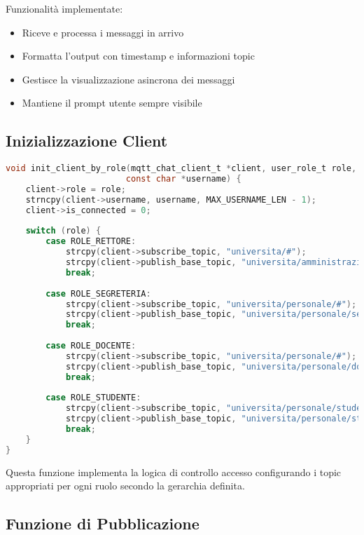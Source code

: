 \documentclass[12pt,a4paper]{article}
\begin{document}
Funzionalità implementate:
\begin{itemize}
    \item Riceve e processa i messaggi in arrivo
    \item Formatta l'output con timestamp e informazioni topic
    \item Gestisce la visualizzazione asincrona dei messaggi
    \item Mantiene il prompt utente sempre visibile
\end{itemize}

\subsection{Inizializzazione Client}

\begin{lstlisting}[language=c, caption=Configurazione Ruolo]
void init_client_by_role(mqtt_chat_client_t *client, user_role_t role, 
                        const char *username) {
    client->role = role;
    strncpy(client->username, username, MAX_USERNAME_LEN - 1);
    client->is_connected = 0;
    
    switch (role) {
        case ROLE_RETTORE:
            strcpy(client->subscribe_topic, "universita/#");
            strcpy(client->publish_base_topic, "universita/amministrazione/rettore");
            break;
            
        case ROLE_SEGRETERIA:
            strcpy(client->subscribe_topic, "universita/personale/#");
            strcpy(client->publish_base_topic, "universita/personale/segreteria");
            break;
            
        case ROLE_DOCENTE:
            strcpy(client->subscribe_topic, "universita/personale/#");
            strcpy(client->publish_base_topic, "universita/personale/docenti");
            break;
            
        case ROLE_STUDENTE:
            strcpy(client->subscribe_topic, "universita/personale/studenti/#");
            strcpy(client->publish_base_topic, "universita/personale/studenti");
            break;
    }
}
\end{lstlisting}

Questa funzione implementa la logica di controllo accesso configurando i topic appropriati per ogni ruolo secondo la gerarchia definita.

\subsection{Funzione di Pubblicazione}
\end{document}

